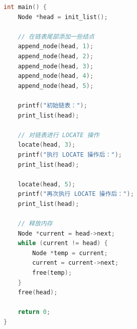 \documentclass[10pt,UTF8]{book} %
\begin{document}
\begin{exercise}
\begin{lstlisting}[language=C]
int main() {
    Node *head = init_list();

    // 在链表尾部添加一些结点
    append_node(head, 1);
    append_node(head, 2);
    append_node(head, 3);
    append_node(head, 4);
    append_node(head, 5);

    printf("初始链表：");
    print_list(head);

    // 对链表进行 LOCATE 操作
    locate(head, 3);
    printf("执行 LOCATE 操作后：");
    print_list(head);

    locate(head, 5);
    printf("再次执行 LOCATE 操作后：");
    print_list(head);

    // 释放内存
    Node *current = head->next;
    while (current != head) {
        Node *temp = current;
        current = current->next;
        free(temp);
    }
    free(head);

    return 0;
}

    \end{lstlisting}
\end{exercise}
\end{document}
